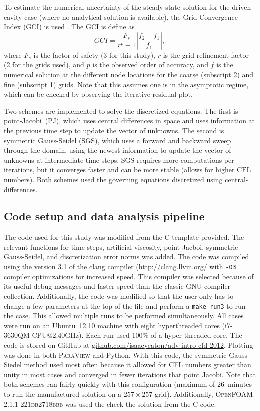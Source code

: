 \documentclass[10pt, letterpaper]{article}
\newcommand{\mesh}[1]{${#1} \times {#1}$}
\begin{document}
To estimate the numerical uncertainty of the steady-state solution for the
driven cavity case (where no analytical solution is available), the Grid 
Convergence Index (GCI) is used \cite{roache1994perspective}.  The GCI is define as
%
\begin{equation}  \label{eqn:gci}
	GCI = \frac{F_s}{r^p - 1} \left| \frac{f_2 - f_1}{f_1} \right|,
\end{equation}
%
where $F_s$ is the factor of safety (3 for this study), $r$ is the grid refinement
factor (2 for the grids used), and $p$ is the observed order of accuracy, and
$f$ is the numerical solution at
the different node locations for the coarse (subscript 2) and fine (subscript 1)
grids.  Note that this assumes one
is in the asymptotic regime, which can be checked by observing the iterative
residual plot.

Two schemes are implemented to solve the discretized equations.  The first is
point-Jacobi~(PJ), which uses central differences in space and uses information
at the previous time step to update the vector of unknowns.  The second is
symmetric Gauss-Seidel (SGS), which uses a forward and backward sweep through
the domain, using the newest information to update the vector of unknowns at
intermediate time steps.  SGS requires more computations per iterations, but
it converges faster and can be more stable (allows for higher $\mathrm{CFL}$
numbers).  Both schemes used the governing equations discretized using
central-differences.


\subsection{Code setup and data analysis pipeline}

The code used for this study was modified from the C template provided.
The relevant functions for time steps, artificial viscosity, point-Jacboi,
symmetric Gauss-Seidel, and discretization error norms was added.  The
code was compiled using the version 3.1 of the clang compiler
(\url{http://clang.llvm.org/} with \texttt{-O3} compiler optimizations for
increased speed.  This compiler was selected because of its useful debug messages
and faster speed than the classic GNU compiler collection.  Additionally, the 
code was modified so that the user only
has to change a few parameters at the top of the file and perform a 
\texttt{make run3} to run the case.  This allowed multiple runs to be performed
simultaneously.  All cases were run on an Ubuntu~12.10 machine with eight
hyperthreaded cores (i7-3630QM CPU@2.40GHz).  Each run used 100\% of a
hyper-threaded core.  The code is stored on
GitHub at \url{github.com/isaacyeaton/adv-intro-cfd-2012}.  Plotting was done 
in both \textsc{ParaView} and Python.  With this code, the symmetric Gauss-Siedel 
method used  most often because it allowed for CFL numbers greater than unity 
in most cases
and converged in fewer iterations that point Jacobi.  Note that both schemes
ran fairly quickly with this configuration (maximum of 26~minutes to run
the manufactured solution on a \mesh{257} grid).  Additionally,
\textsc{OpenFOAM-2.1.1-221db2718bbb} was used the check the solution from
the C code.
\end{document}
